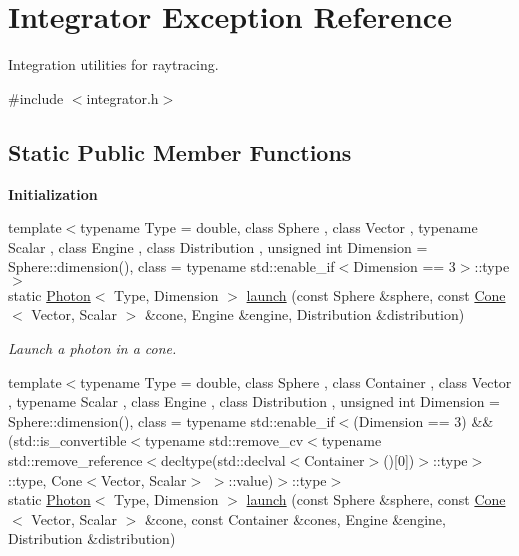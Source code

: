 \hypertarget{exceptionIntegrator}{\section{Integrator Exception Reference}
\label{exceptionIntegrator}
}


Integration utilities for raytracing.  




{\ttfamily \#include $<$integrator.\-h$>$}

\subsection*{Static Public Member Functions}
\begin{Indent}{\bf Initialization}\par
\begin{DoxyCompactItemize}
\item 
{\footnotesize template$<$typename Type  = double, class Sphere , class Vector , typename Scalar , class Engine , class Distribution , unsigned int Dimension = Sphere\-::dimension(), class  = typename std\-::enable\-\_\-if$<$\-Dimension == 3$>$\-::type$>$ }\\static \hyperlink{exceptionPhoton}{Photon}$<$ Type, Dimension $>$ \hyperlink{exceptionIntegrator_afa4fc23bb2d561af06390f232ff44fd0}{launch} (const Sphere \&sphere, const \hyperlink{exceptionCone}{Cone}$<$ Vector, Scalar $>$ \&cone, Engine \&engine, Distribution \&distribution)
\begin{DoxyCompactList}\small\item\em Launch a photon in a cone. \end{DoxyCompactList}\item 
{\footnotesize template$<$typename Type  = double, class Sphere , class Container , class Vector , typename Scalar , class Engine , class Distribution , unsigned int Dimension = Sphere\-::dimension(), class  = typename std\-::enable\-\_\-if$<$(\-Dimension == 3) \&\& (std\-::is\-\_\-convertible$<$typename std\-::remove\-\_\-cv$<$typename std\-::remove\-\_\-reference$<$decltype(std\-::declval$<$\-Container$>$()\mbox{[}0\mbox{]})$>$\-::type$>$\-::type, Cone$<$\-Vector, Scalar$>$ $>$\-::value)$>$\-::type$>$ }\\static \hyperlink{exceptionPhoton}{Photon}$<$ Type, Dimension $>$ \hyperlink{exceptionIntegrator_ad47a9c114d8fb6c7d285789ec10424e6}{launch} (const Sphere \&sphere, const \hyperlink{exceptionCone}{Cone}$<$ Vector, Scalar $>$ \&cone, const Container \&cones, Engine \&engine, Distribution \&distribution)

\end{DoxyCompactItemize}
\end{Indent}
